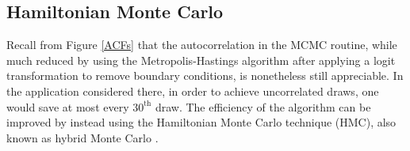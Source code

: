 \documentclass{article}
\begin{document}




\subsection{Hamiltonian Monte Carlo}

Recall from Figure \ref{ACFs} that the autocorrelation in the MCMC routine, while much reduced by using the Metropolis-Hastings algorithm after applying a logit transformation to remove boundary conditions, is nonetheless still appreciable. In the application considered there, in order to achieve uncorrelated draws, one would save at most every $30^{\text{th} }$ draw. The efficiency of the algorithm can be improved by instead using the Hamiltonian Monte Carlo technique (HMC), also known as hybrid Monte Carlo \citep{Duane1987}. 
\end{document}
